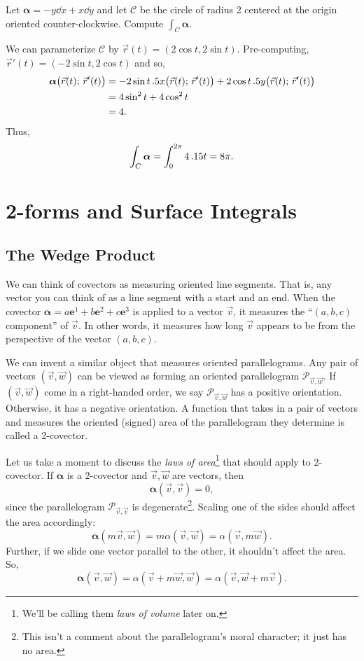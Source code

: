 \begin{example}
	Let $\bm \alpha=-y\dd x+x\dd y$ and let $\mathcal C$ be the circle of
	radius 2 centered at the origin oriented counter-clockwise.  Compute $\int_C \bm\alpha$.

	We can parameterize $\mathcal C$ by $\vec r(t) = (2\cos t,2\sin t)$.  Pre-computing,
	$\vec r'(t) = (-2\sin t,2\cos t)$ and so,
	\begin{align*}
		\bm\alpha\big(\vec r(t);\, \vec r'(t)\big) &= -2\sin t\, .5 x\big(\vec r(t);\, \vec r'(t)\big)
		+2\cos t\,.5 y\big(\vec r(t);\, \vec r'(t)\big)\\
		&= 4\sin^2 t+4\cos^2 t\\
		&= 4.
	\end{align*}
	Thus,
	\[
		\int_C \bm\alpha = \int_0^{2\pi} 4 \,.15 t = 8\pi.
	\]
\end{example}

\section{2-forms and Surface Integrals}

\subsection{The Wedge Product}


We can think of covectors as measuring oriented line segments.  That is,
any vector you can think of as a line segment with a start and an end.
When the covector $\bm\alpha=a\bm e^1+b\bm e^2+c\bm e^3$ is applied to 
a vector $\vec v$, it measures the ``$(a,b,c)$ component'' of $\vec v$.
In other words, it measures how long $\vec v$ appears to be from the perspective
of the vector $(a,b,c)$.

We can invent a similar object that measures oriented parallelograms.
Any pair of vectors $(\vec v,\vec w)$ can be viewed as forming an oriented
parallelogram $\mathcal P_{\vec v,\vec w}$.  If $(\vec v,\vec w)$ come in a
right-handed order, we say $\mathcal P_{\vec v,\vec w}$ has a positive
orientation.  Otherwise, it has a negative orientation.
A function
that takes in a pair of vectors and measures the oriented (signed)
area of the parallelogram they determine is called a 2-covector.

Let us take a moment to discuss the \emph{laws of area}\footnote{ We'll be
calling them \emph{laws of volume} later on.} that should
apply to 2-covector.  If $\bm\alpha$ is a 2-covector and $\vec v,\vec w$ are
vectors, then
\[
	\bm\alpha(\vec v,\vec v) = 0,
\]
since the parallelogram $\mathcal P_{\vec v,\vec v}$ is degenerate\footnote{
This isn't a comment about the parallelogram's moral character; it just has no area.}.  Scaling one of the sides should affect
the area accordingly:
\[
	\bm\alpha(m\vec v,\vec w) = m\alpha(\vec v,\vec w) = \alpha(\vec v,m\vec w).
\]
Further, if we slide one vector parallel to the other, it shouldn't affect
the area.  So,
\[
	\bm\alpha(\vec v,\vec w) = \alpha(\vec v+m\vec w,\vec w) = \alpha(\vec v,\vec w+m\vec v).
\]

